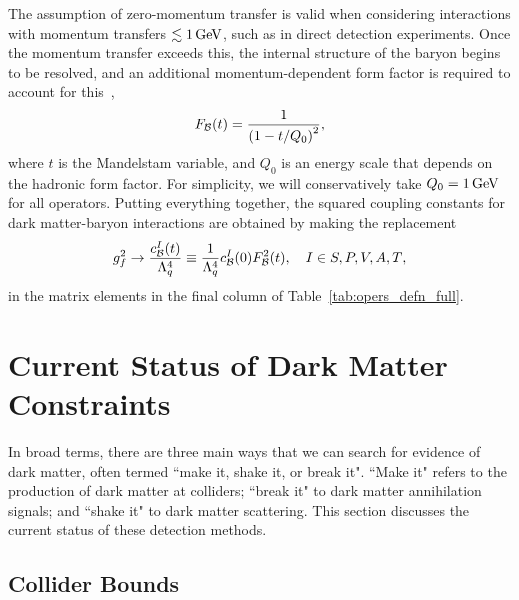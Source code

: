 The assumption of zero-momentum transfer is valid when considering interactions with momentum transfers $\lesssim 1{\rm \,GeV}$, such as in direct detection experiments. Once the momentum transfer exceeds this, the internal structure of the baryon begins to be resolved, and an additional momentum-dependent form factor is required to account for this~\cite{_ElectromagneticStructureNucleon},
\begin{equation}
    F_{\cal B}(t) = \frac{1}{\left( 1 - t/Q_0\right)^2},
\end{equation}
where $t$ is the Mandelstam variable, and $Q_0$ is an energy scale that depends on the hadronic form factor. For simplicity, we will conservatively take $Q_0 = 1 {\rm \,GeV}$ for all operators.
Putting everything together, the squared coupling constants for dark matter-baryon interactions are obtained by making the replacement
\begin{equation}
    g_f^2 \rightarrow \frac{c^I_{\cal B}(t)}{\Lambda_q^4} \equiv \frac{1}{\Lambda_q^4}c_{\cal B}^I(0)F^2_{\cal B}(t),\quad I\in {S, P, V, A, T},
\end{equation}
in the matrix elements in the final column of Table~\ref{tab:opers_defn_full}.



\section{Current Status of Dark Matter Constraints}

In broad terms, there are three main ways that we can search for evidence of dark matter, often termed ``make it, shake it, or break it". ``Make it" refers to the production of dark matter at colliders; ``break it" to dark matter annihilation signals; and ``shake it" to dark matter scattering. 
This section discusses the current status of these detection methods. 


\subsection{Collider Bounds}

